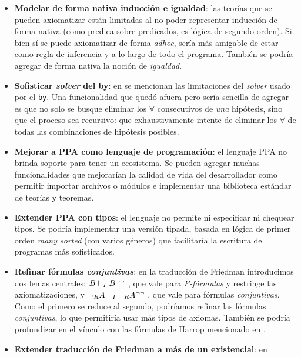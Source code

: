 \begin{itemize}
    \item \textbf{Modelar de forma nativa inducción e igualdad}: las teorías que
    se pueden axiomatizar están limitadas al no poder representar inducción de
    forma nativa (como predica sobre predicados, es lógica de segundo orden). Si
    bien sí se puede axiomatizar de forma \textit{adhoc}, sería más amigable de
    estar como regla de inferencia y a lo largo de todo el programa. También se
    podría agregar de forma nativa la noción de \textit{igualdad}.
    \item \textbf{Sofisticar \textit{solver} del by}: en
     se mencionan las limitaciones del
    \textit{solver} usado por el \lstinline{by}. Una funcionalidad que quedó
    afuera pero sería sencilla de agregar es que no solo se busque eliminar los
    $\forall$ consecutivos de \textit{una} hipótesis, sino que el proceso sea
    recursivo: que exhaustivamente intente de eliminar los $\forall$ de todas
    las combinaciones de hipótesis posibles.
    \item \textbf{Mejorar a PPA como lenguaje de programación}: el
    lenguaje PPA no brinda soporte para tener un ecosistema. Se pueden agregar
    muchas funcionalidades que mejorarían la calidad de vida del desarrollador
    como permitir importar archivos o módulos e implementar una biblioteca
    estándar de teorías y teoremas.
    \item \textbf{Extender PPA con tipos}: el lenguaje no permite ni especificar
    ni chequear tipos. Se podría implementar una versión tipada, basada en
    lógica de primer orden \textit{many sorted} (con varios géneros) que
    facilitaría la escritura de programas más sofisticados.
    \item \textbf{Refinar fórmulas \textit{conjuntivas}}: en la traducción de
    Friedman introducimos dos lemas centrales: $B \vdash_I B^{\neg\neg}$
    , que vale para \textit{F-fórmulas}
    y restringe las axiomatizaciones, y $\neg_R
    A \vdash_I \neg_R A^{\neg\neg}$ , que
    vale para fórmulas \textit{conjuntivas}. Como el primero se reduce al
    segundo, podríamos refinar las fórmulas \textit{conjuntivas}, lo que
    permitiría usar más tipos de axiomas. También se podría profundizar en el
    vínculo con las fórmulas de Harrop mencionado en .
    \item \textbf{Extender traducción de Friedman a más de un existencial}: en

\end{itemize}
